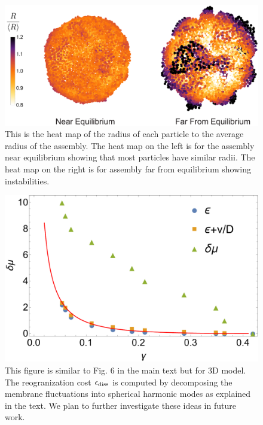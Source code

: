 \documentclass[amsmath,preprintnumbers,10pt,nofootinbib,prl,twocolumn]{revtex4-1}
\begin{document}
\begin{figure}
\includegraphics[width=1\linewidth,angle=0]{Fig11.pdf}
\caption{ This is the heat map of the radius of each particle to the average radius of the assembly. The heat map on the left is for the assembly near equilibrium showing that most particles have similar radii. The heat map on the right is for assembly far from equilibrium showing instabilities.  }
\label{fig:relativeradius3D}
\end{figure}
\begin{figure}
\includegraphics[width=1\linewidth,angle=0]{Fig12.pdf}
\caption{ This figure is similar to Fig. 6 in the main text but for 3D model. The reogranization cost $\epsilon_{\rm diss}$ is computed by decomposing the membrane fluctuations into spherical harmonic modes as explained in the text. We plan to further investigate these ideas in future work.}
\label{fig:boundsof3Dmembrane}
\end{figure}

\end{document}
